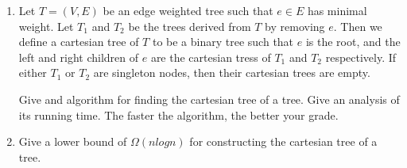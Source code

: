 \documentclass[12pt]{article}
\begin{document}
\begin{enumerate}
\item Let $T = (V,E)$ be an edge weighted tree such that $e \in E$ has minimal
    weight.  Let $T_1$ and $T_2$ be the trees derived from $T$ by removing $e$.
    Then we define a cartesian tree of $T$ to be a binary tree such that $e$ is
    the root, and the left and right children of $e$ are the cartesian tress of
    $T_1$ and $T_2$ respectively. If either $T_1$ or $T_2$ are singleton nodes,
    then their cartesian trees are empty.

    Give and algorithm for finding the cartesian tree of a tree. Give an
    analysis of its running time. The faster the algorithm, the better your
    grade.

\item Give a lower bound of $\Omega(nlogn)$ for constructing the cartesian tree
    of a tree.

\end{enumerate}
\end{document}
